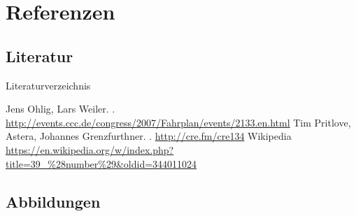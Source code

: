 \documentclass[hyperref={pdfpagelabels=false}]{beamer}
\begin{document}
\appendix

\section{Referenzen}

\subsection{Literatur}

\begin{frame}{Literaturverzeichnis}
    \begin{thebibliography}{XX}
        \beamertemplatetextbibitems
            Jens Ohlig, Lars Weiler.
            .
            \footnotesize
            \newblock \url{http://events.ccc.de/congress/2007/Fahrplan/events/2133.en.html}
            \normalsize
            Tim Pritlove, Astera, Johannes Grenzfurthner.
            .
            \newblock \url{http://cre.fm/cre134}
            Wikipedia
            \scriptsize
            \newblock \url{https://en.wikipedia.org/w/index.php?title=39\_\%28number\%29\&oldid=344011024}
            \normalsize
    \end{thebibliography}
\end{frame}

\subsection{Abbildungen}
\end{document}
